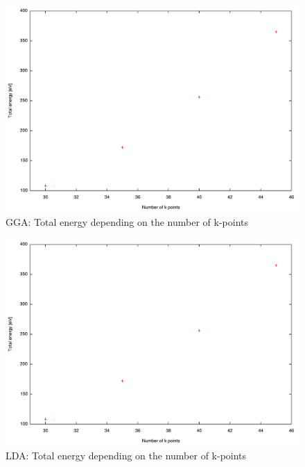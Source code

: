 \documentclass[12pt,a4paper]{scrartcl}
\begin{document}
\begin{figure}[H]
\begin{center}
\includegraphics[width=12.0cm]{GGA_kgrid.pdf}
\end{center}
\caption{GGA: Total energy depending on the number of k-points}
\end{figure}
\begin{figure}[H]
\begin{center}
\includegraphics[width=12.0cm]{LDA_kgrid.pdf}
\end{center}
\caption{LDA: Total energy depending on the number of k-points}
\end{figure}
\end{document}
